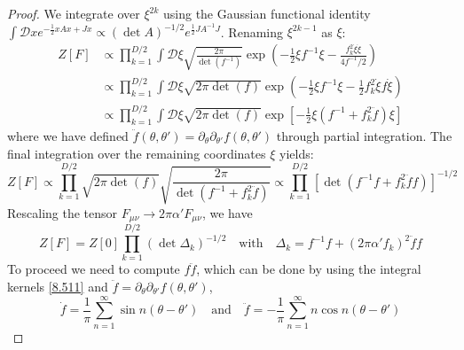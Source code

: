 \begin{tcolorbox}[breakable]
\begin{proof}
			We integrate over $\xi^{2k}$ using the Gaussian functional identity $\int \mathcal{D}x e^{-\frac{1}{2} x A x + Jx} \propto (\det A)^{-1/2} e^{\frac{1}{2} J A^{-1} J}$. Renaming $\xi^{2k-1}$ as $\xi$:
			\begin{align}
				Z[F] &\propto \prod_{k=1}^{D/2} \int \mathcal{D}\xi \sqrt{\frac{2\pi}{\det(f^{-1})}} \exp \left( -\frac{1}{2} \xi f^{-1} \xi - \frac{f_k^2 \dot{\xi} \dot{\xi}}{4 f^{-1}/2} \right) \\
				&\propto \prod_{k=1}^{D/2} \int \mathcal{D}\xi \sqrt{2\pi \det(f)} \exp \left( -\frac{1}{2} \xi f^{-1} \xi - \frac{1}{2} f_k^2 \dot{\xi} f \dot{\xi} \right) \\
				&\propto \prod_{k=1}^{D/2} \int \mathcal{D}\xi \sqrt{2\pi \det(f)} \exp \left[ -\frac{1}{2} \xi \left( f^{-1} + f_k^2 \ddot{f} \right) \xi \right]
			\end{align}
			where we have defined $\ddot{f}(\theta, \theta') = \partial_\theta \partial_{\theta'} f(\theta, \theta')$ through partial integration. The final integration over the remaining coordinates $\xi$ yields:
			\begin{equation}
				Z[F] \propto \prod_{k=1}^{D/2} \sqrt{2\pi \det(f)} \sqrt{\frac{2\pi}{\det(f^{-1} + f_k^2 \ddot{f})}} \propto \prod_{k=1}^{D/2} \left[ \det(f^{-1}f + f_k^2 \ddot{f} f) \right]^{-1/2}
			\end{equation}
			Rescaling the tensor $F_{\mu\nu} \to 2\pi\alpha' F_{\mu\nu}$, we have
			\begin{equation}
				Z[F] = Z[0] \prod_{k=1}^{D/2} (\det \Delta_k)^{-1/2} \quad \text{with} \quad \Delta_k = f^{-1}f + (2\pi\alpha' f_k)^2 \ddot{f} f\label{8.538}
			\end{equation}
			To proceed we need to compute $f \ddot{f}$, which can be done by using the integral kernels \eqref{8.511} and $\ddot{f} = \partial_\theta \partial_{\theta'} f(\theta, \theta')$,
			\begin{equation}
				\dot{f} = \frac{1}{\pi} \sum_{n=1}^{\infty} \sin n(\theta - \theta') \quad \text{and} \quad \ddot{f} = -\frac{1}{\pi} \sum_{n=1}^{\infty} n \cos n(\theta - \theta')
			\end{equation}
			

\end{proof}
\end{tcolorbox}
